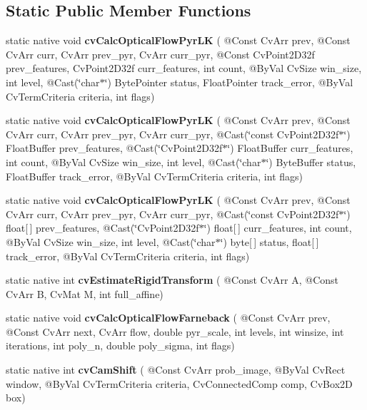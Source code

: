 \subsection*{Static Public Member Functions}
\begin{DoxyCompactItemize}
\item 
static native void {\bfseries cv\+Calc\+Optical\+Flow\+Pyr\+LK} ( @Const Cv\+Arr prev, @Const Cv\+Arr curr, Cv\+Arr prev\+\_\+pyr, Cv\+Arr curr\+\_\+pyr, @Const Cv\+Point2\+D32f prev\+\_\+features, Cv\+Point2\+D32f curr\+\_\+features, int count, @By\+Val Cv\+Size win\+\_\+size, int level, @Cast(\char`\"{}char$\ast$\char`\"{}) Byte\+Pointer status, Float\+Pointer track\+\_\+error, @By\+Val Cv\+Term\+Criteria criteria, int flags)
\item 
static native void {\bfseries cv\+Calc\+Optical\+Flow\+Pyr\+LK} ( @Const Cv\+Arr prev, @Const Cv\+Arr curr, Cv\+Arr prev\+\_\+pyr, Cv\+Arr curr\+\_\+pyr, @Cast(\char`\"{}const Cv\+Point2\+D32f$\ast$\char`\"{}) Float\+Buffer prev\+\_\+features, @Cast(\char`\"{}Cv\+Point2\+D32f$\ast$\char`\"{}) Float\+Buffer curr\+\_\+features, int count, @By\+Val Cv\+Size win\+\_\+size, int level, @Cast(\char`\"{}char$\ast$\char`\"{}) Byte\+Buffer status, Float\+Buffer track\+\_\+error, @By\+Val Cv\+Term\+Criteria criteria, int flags)
\item 
static native void {\bfseries cv\+Calc\+Optical\+Flow\+Pyr\+LK} ( @Const Cv\+Arr prev, @Const Cv\+Arr curr, Cv\+Arr prev\+\_\+pyr, Cv\+Arr curr\+\_\+pyr, @Cast(\char`\"{}const Cv\+Point2\+D32f$\ast$\char`\"{}) float\mbox{[}$\,$\mbox{]} prev\+\_\+features, @Cast(\char`\"{}Cv\+Point2\+D32f$\ast$\char`\"{}) float\mbox{[}$\,$\mbox{]} curr\+\_\+features, int count, @By\+Val Cv\+Size win\+\_\+size, int level, @Cast(\char`\"{}char$\ast$\char`\"{}) byte\mbox{[}$\,$\mbox{]} status, float\mbox{[}$\,$\mbox{]} track\+\_\+error, @By\+Val Cv\+Term\+Criteria criteria, int flags)
\item 
static native int {\bfseries cv\+Estimate\+Rigid\+Transform} ( @Const Cv\+Arr A, @Const Cv\+Arr B, Cv\+Mat M, int full\+\_\+affine)
\item 
static native void {\bfseries cv\+Calc\+Optical\+Flow\+Farneback} ( @Const Cv\+Arr prev, @Const Cv\+Arr next, Cv\+Arr flow, double pyr\+\_\+scale, int levels, int winsize, int iterations, int poly\+\_\+n, double poly\+\_\+sigma, int flags)
\item 
static native int {\bfseries cv\+Cam\+Shift} ( @Const Cv\+Arr prob\+\_\+image, @By\+Val Cv\+Rect window, @By\+Val Cv\+Term\+Criteria criteria, Cv\+Connected\+Comp comp, Cv\+Box2D box)

\end{DoxyCompactItemize}
